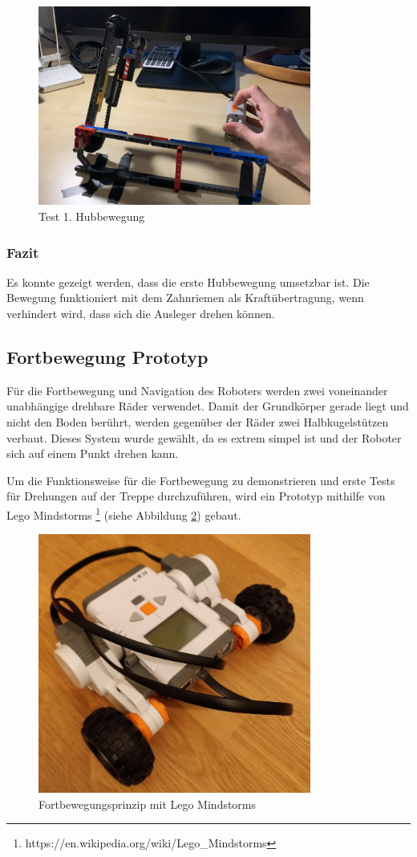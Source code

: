 \begin{figure}[H]
  \includegraphics[width=0.8\textwidth]{img/Test 1. Hub.png}
  \centering
  \caption{Test 1. Hubbewegung}
  \label{fig:prototyp-2-treppensteigen}
\end{figure}

\subsubsection{Fazit}
Es konnte gezeigt werden, dass die erste Hubbewegung umsetzbar ist. Die Bewegung funktioniert mit dem Zahnriemen als Kraftübertragung, wenn verhindert wird, dass sich die Ausleger drehen können.

\newpage
\subsection{Fortbewegung Prototyp}
Für die Fortbewegung und Navigation des Roboters werden zwei voneinander unabhängige drehbare Räder verwendet. Damit der Grundkörper gerade liegt und nicht den Boden berührt, werden gegenüber der Räder zwei Halbkugelstützen verbaut.
Dieses System wurde gewählt, da es extrem simpel ist und der Roboter sich auf einem Punkt drehen kann.

Um die Funktionsweise für die Fortbewegung zu demonstrieren und erste Tests für Drehungen auf
der Treppe durchzuführen, wird ein Prototyp mithilfe von Lego Mindstorms \footnote{https://en.wikipedia.org/wiki/Lego\_Mindstorms} (siehe Abbildung \ref{fig:lego-mindstorms}) gebaut.

\begin{figure}[H]
  \includegraphics[width=0.8\textwidth]{img/Fortbewegung/fortbewegung.png}
  \centering
  \caption{Fortbewegungsprinzip mit Lego Mindstorms}
  \label{fig:lego-mindstorms}
\end{figure}




